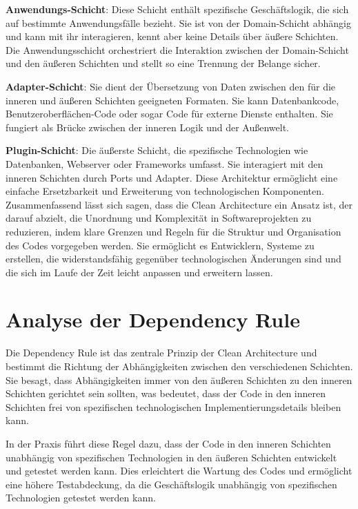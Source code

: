 \textbf{Anwendungs-Schicht}: Diese Schicht enthält spezifische Geschäftslogik, die sich auf bestimmte Anwendungsfälle bezieht. Sie ist von der Domain-Schicht abhängig und kann mit ihr interagieren, kennt aber keine Details über äußere Schichten. Die Anwendungsschicht orchestriert die Interaktion zwischen der Domain-Schicht und den äußeren Schichten und stellt so eine Trennung der Belange sicher.

\textbf{Adapter-Schicht}: Sie dient der Übersetzung von Daten zwischen den für die inneren und äußeren Schichten geeigneten Formaten. Sie kann Datenbankcode, Benutzeroberflächen-Code oder sogar Code für externe Dienste enthalten. Sie fungiert als Brücke zwischen der inneren Logik und der Außenwelt.

\textbf{Plugin-Schicht}: Die äußerste Schicht, die spezifische Technologien wie Datenbanken, Webserver oder Frameworks umfasst. Sie interagiert mit den inneren Schichten durch Ports und Adapter. Diese Architektur ermöglicht eine einfache Ersetzbarkeit und Erweiterung von technologischen Komponenten.\\

Zusammenfassend lässt sich sagen, dass die Clean Architecture ein Ansatz ist, der darauf abzielt, die Unordnung und Komplexität in Softwareprojekten zu reduzieren, indem klare Grenzen und Regeln für die Struktur und Organisation des Codes vorgegeben werden. Sie ermöglicht es Entwicklern, Systeme zu erstellen, die widerstandsfähig gegenüber technologischen Änderungen sind und die sich im Laufe der Zeit leicht anpassen und erweitern lassen.
\section{Analyse der Dependency Rule}
Die Dependency Rule ist das zentrale Prinzip der Clean Architecture und bestimmt die Richtung der Abhängigkeiten zwischen den verschiedenen Schichten. Sie besagt, dass Abhängigkeiten immer von den äußeren Schichten zu den inneren Schichten gerichtet sein sollten, was bedeutet, dass der Code in den inneren Schichten frei von spezifischen technologischen Implementierungsdetails bleiben kann.

In der Praxis führt diese Regel dazu, dass der Code in den inneren Schichten unabhängig von spezifischen Technologien in den äußeren Schichten entwickelt und getestet werden kann. Dies erleichtert die Wartung des Codes und ermöglicht eine höhere Testabdeckung, da die Geschäftslogik unabhängig von spezifischen Technologien getestet werden kann.

